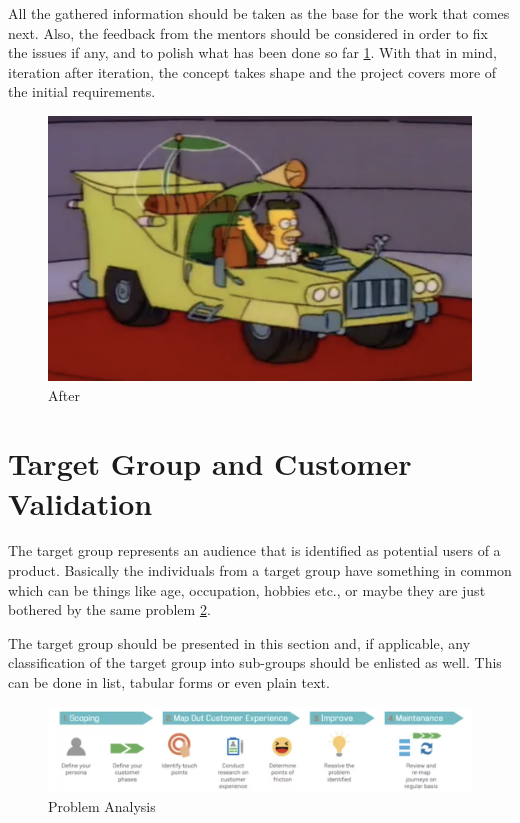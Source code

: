 All the gathered information should be taken as the base for the work that comes next. 
Also, the feedback from the mentors should be considered in order to fix the issues if any, and to polish what has been done so far \ref{fig:after}.
With that in mind, iteration after iteration, the concept takes shape and the project covers more of the initial requirements.

\begin{figure}[H]
    \includegraphics[width=\textwidth]{images/after.png}
    \caption{After}
    \label{fig:after}
\end{figure}

\section{Target Group and Customer Validation}

The target group represents an audience that is identified as potential users of a product. 
Basically the individuals from a target group have something in common which can be things like age, occupation, hobbies etc., or maybe they are just bothered by the same problem \ref{fig:problem_analysis}.

The target group should be presented in this section and, if applicable, any classification of the target group into sub-groups should be enlisted as well. 
This can be done in list, tabular forms or even plain text.


\begin{figure}[H]
    \includegraphics[width=\textwidth]{images/problem_analysis.png}
    \caption{Problem Analysis}
    \label{fig:problem_analysis}
\end{figure}



